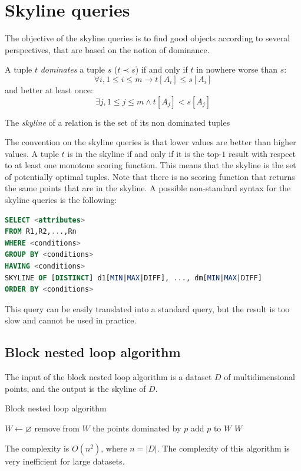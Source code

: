 \documentclass[12pt, a4paper]{report}
\newtheorem[style=M,bodystyle=\normalfont]{theorem}{Theorem}
\newtheorem[style=M,bodystyle=\normalfont]{corollary}{Corollary}
\newtheorem[style=M,bodystyle=\normalfont]{lemma}{Lemma}
\newtheorem[style=M,bodystyle=\normalfont]{definition}{Definition}
\begin{document}
    \section{Skyline queries}
    The objective of the skyline queries is to find good objects according to several perspectives, that are based on the notion of dominance. 
    \begin{definition}
        A tuple $t$ \emph{dominates} a tuple $s$ ($t \prec s$) if and only if $t$ in nowhere worse than $s$: 
        \[\forall i, 1 \leq i \leq m \rightarrow t[A_i] \leq s[A_i]\] 
        and better at least once: 
        \[\exists j, 1 \leq j \leq m \land t[A_j] < s[A_j]\]


        The \emph{skyline} of a relation is the set of its non dominated tuples
    \end{definition}
    The convention on the skyline queries is that lower values are better than higher values. A tuple $t$ is in the skyline if
    and only if  it is the top-$1$ result with respect to at least one monotone scoring function. This means that the skyline is the set of potentially optimal tuples. 
    Note that there is no scoring function that returns the same points that are in the skyline. A possible non-standard syntax for the 
    skyline queries is the following: 
    \begin{lstlisting}[language=SQL]
SELECT <attributes>
FROM R1,R2,...,Rn
WHERE <conditions>
GROUP BY <conditions>
HAVING <conditions>
SKYLINE OF [DISTINCT] d1[MIN|MAX|DIFF], ..., dm[MIN|MAX|DIFF]
ORDER BY <conditions>
    \end{lstlisting}
    This query can be easily translated into a standard query, but the result is too slow and cannot be used in practice. 

    \subsection{Block nested loop algorithm}
    The input of the block nested loop algorithm is a dataset $D$ of multidimensional points, and the output is the skyline of $D$.
    \begin{algorithm}[H]
        \caption{Block nested loop algorithm}
            \begin{algorithmic}[1]
                \State $W \leftarrow \varnothing$
                        \State remove from $W$ the points dominated by $p$
                        \State add $p$ to $W$
                    \EndIf
                \EndFor
                \State \Return $W$
            \end{algorithmic}
    \end{algorithm}
    The complexity is $O(n^2)$, where $n=\left\lvert D \right\rvert $. The complexity of this algorithm is very inefficient for large datasets. 
\end{document}
